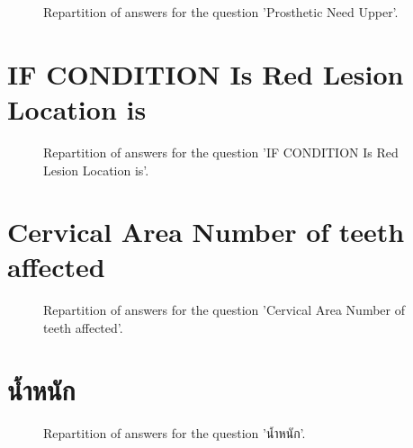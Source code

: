 \documentclass[12pt]{article}
\begin{document}
\begin{figure}[h!]
    \caption{\label{figure:q71-1}Repartition of answers for the question 'Prosthetic Need
Upper'.}
\end{figure}



\clearpage{}
\section{IF CONDITION Is Red Lesion 
Location is}

\label{sec:170}


\begin{figure}[h!]
    \caption{\label{figure:q170-1}Repartition of answers for the question 'IF CONDITION Is Red Lesion 
Location is'.}
\end{figure}



\clearpage{}
\section{Cervical Area
Number of teeth affected}

\label{sec:176}


\begin{figure}[h!]
    \caption{\label{figure:q176-1}Repartition of answers for the question 'Cervical Area
Number of teeth affected'.}
\end{figure}



\clearpage{}
\section{น้ำหนัก}

\label{sec:16}


\begin{figure}[h!]
    \caption{\label{figure:q16-1}Repartition of answers for the question 'น้ำหนัก'.}
\end{figure}
\end{document}
